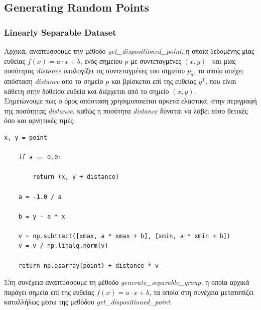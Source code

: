 \documentclass[12pt]{article}
\begin{document}
\subsection{Generating Random Points}

\subsubsection{Linearly Separable Dataset}

Αρχικά, αναπτύσσουμε την μέθοδο \textit{get\_dispositioned\_point},
η οποία δεδομένης μίας ευθείας \( f(x) = a \cdot x + b \),
ενός σημείου \( p \) με συντεταγμένες \( (x, y) \) \ και
μίας ποσότητας \textit{distance} υπολογίζει τις συντεταγμένες του σημείου \( p_d \),
το οποίο απέχει απόσταση \textit{distance} απο το σημείο \( p \) και
βρίσκεται επί της ευθείας \( y^T \), που είναι κάθετη στην δοθείσα ευθεία και
διέρχεται από το σημείο \( (x, y) \). \\

Σημειώνουμε πως ο όρος απόσταση χρησιμοποιείται αρκετά ελαστικά,
στην περιγραφή της ποσότητας \textit{distance},
καθώς η ποσότητα \textit{distance} δύναται να λάβει τόσο θετικές όσο και αρνητικές τιμές. \\

\begin{lstlisting}[caption={Η μέθοδος \textit{get\_dispositioned\_point}}]
    x, y = point

    if a == 0.0:

        return (x, y + distance)

    a = -1.0 / a

    b = y - a * x

    v = np.subtract([xmax, a * xmax + b], [xmin, a * xmin + b])
    v = v / np.linalg.norm(v)

    return np.asarray(point) + distance * v
\end{lstlisting}

\pagebreak

Στη συνέχεια αναπτύσσουμε τη μέθοδο \textit{generate\_separable\_group},
η οποία αρχικά παράγει σημεία επί της ευθείας \( f(x) = a \cdot x + b \),
τα οποία στη συνέχεια μετατοπίζει καταλλήλως μέσω της μεθόδου \textit{get\_dispositioned\_point}. \\
\end{document}
